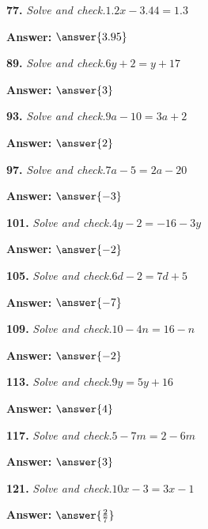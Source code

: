 \documentclass{ximera}
\begin{document}
\begin{problem}
\textbf{77.} \emph{Solve and check.}\quad $1.2x - 3.44 = 1.3$

\textbf{Answer:} $\answer{3.95}$
\end{problem}

\begin{problem}
\textbf{89.} \emph{Solve and check.}\quad $6y + 2 = y + 17$

\textbf{Answer:} $\answer{3}$
\end{problem}

\begin{problem}
\textbf{93.} \emph{Solve and check.}\quad $9a - 10 = 3a + 2$

\textbf{Answer:} $\answer{2}$
\end{problem}

\begin{problem}
\textbf{97.} \emph{Solve and check.}\quad $7a - 5 = 2a - 20$

\textbf{Answer:} $\answer{-3}$
\end{problem}

\begin{problem}
\textbf{101.} \emph{Solve and check.}\quad $4y - 2 = -16 - 3y$

\textbf{Answer:} $\answer{-2}$
\end{problem}

\begin{problem}
\textbf{105.} \emph{Solve and check.}\quad $6d - 2 = 7d + 5$

\textbf{Answer:} $\answer{-7}$
\end{problem}

\begin{problem}
\textbf{109.} \emph{Solve and check.}\quad $10 - 4n = 16 - n$

\textbf{Answer:} $\answer{-2}$
\end{problem}

\begin{problem}
\textbf{113.} \emph{Solve and check.}\quad $9y = 5y + 16$

\textbf{Answer:} $\answer{4}$
\end{problem}

\begin{problem}
\textbf{117.} \emph{Solve and check.}\quad $5 - 7m = 2 - 6m$

\textbf{Answer:} $\answer{3}$
\end{problem}

\begin{problem}
\textbf{121.} \emph{Solve and check.}\quad $10x - 3 = 3x - 1$

\textbf{Answer:} $\answer{\frac{2}{7}}$
\end{problem}
\end{document}
